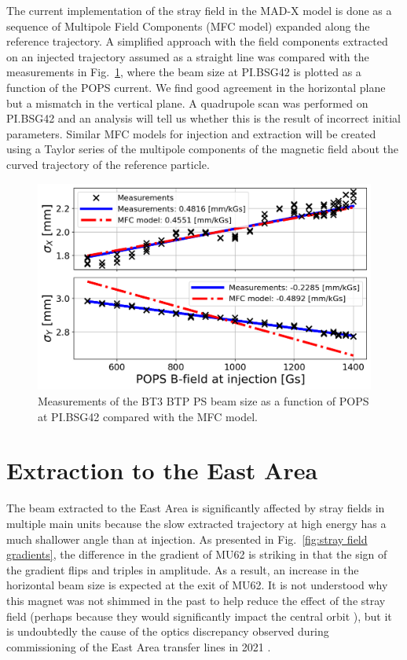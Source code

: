 \documentclass[a4paper,
               biblatex,     %
               keeplastbox,   %
               ]{jacow}
\begin{document}
The current implementation of the stray field in the \mbox{MAD-X} model is done as a sequence of Multipole Field Components (MFC model) expanded along the reference trajectory. A simplified approach with the field components extracted on an injected trajectory assumed as a straight line was compared with the measurements in Fig.~\ref{fig:injection_btp_beam_size}, where the beam size at PI.BSG42 is plotted as a function of the POPS current. We find good agreement in the horizontal plane but a mismatch in the vertical plane. A quadrupole scan was performed on PI.BSG42 and an analysis will tell us whether this is the result of incorrect initial parameters. Similar MFC models for injection and extraction will be created using a Taylor series of the multipole components of the magnetic field about the curved trajectory of the reference particle.

\begin{figure}[!htb]
   \centering
   \includegraphics*[width=1.0\columnwidth]{MOPOTK030_f6.png}
   \caption{Measurements of the BT3 BTP PS beam size as a function of POPS at PI.BSG42 compared with the MFC model.}
   \label{fig:injection_btp_beam_size}
\end{figure}

\section{Extraction to the East Area}
The beam extracted to the East Area is significantly affected by stray fields in multiple main units because the slow extracted trajectory at high energy has a much shallower angle than at injection. As presented in Fig.~\ref{fig:stray field gradients}, the difference in the gradient of MU62 is striking in that the sign of the gradient flips and triples in amplitude. As a result, an increase in the horizontal beam size is expected at the exit of MU62. It is not understood why this magnet was not shimmed in the past to help reduce the effect of the stray field (perhaps because they would significantly impact the central orbit \cite{Zickler:private}), but it is undoubtedly the cause of the optics discrepancy observed during commissioning of the East Area transfer lines in 2021 \cite{huschauer:ipac22-mopost006}.
\end{document}
